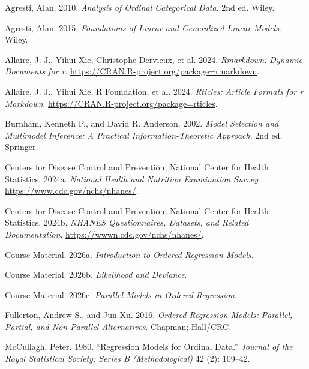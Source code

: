 \documentclass{article}
\newlength{\cslhangindent}
\newenvironment{CSLReferences}[2] %
 {\begin{list}{}{%
  \setlength{\itemindent}{0pt}
  \setlength{\leftmargin}{0pt}
  \setlength{\parsep}{0pt}
  \ifodd #1
   \setlength{\leftmargin}{\cslhangindent}
   \setlength{\itemindent}{-1\cslhangindent}
  \fi
  \setlength{\itemsep}{#2\baselineskip}}}
 {\end{list}}
\begin{document}
\protect{}\label{refs}
\begin{CSLReferences}{1}{1}
Agresti, Alan. 2010. \emph{Analysis of Ordinal Categorical Data}. 2nd
ed. Wiley.

Agresti, Alan. 2015. \emph{Foundations of Linear and Generalized Linear
Models}. Wiley.

Allaire, J. J., Yihui Xie, Christophe Dervieux, et al. 2024.
\emph{Rmarkdown: Dynamic Documents for r}.
\url{https://CRAN.R-project.org/package=rmarkdown}.

{Allaire, J. J., Yihui Xie, R Foundation, et al.} 2024. \emph{Rticles:
Article Formats for r Markdown}.
\url{https://CRAN.R-project.org/package=rticles}.

Burnham, Kenneth P., and David R. Anderson. 2002. \emph{Model Selection
and Multimodel Inference: A Practical Information-Theoretic Approach}.
2nd ed. Springer.

Centers for Disease Control and Prevention, National Center for Health
Statistics. 2024a. \emph{National Health and Nutrition Examination
Survey}. \url{https://www.cdc.gov/nchs/nhanes/}.

Centers for Disease Control and Prevention, National Center for Health
Statistics. 2024b. \emph{NHANES Questionnaires, Datasets, and Related
Documentation}. \url{https://wwwn.cdc.gov/nchs/nhanes/}.

Course Material. 2026a. \emph{Introduction to Ordered Regression
Models}.

Course Material. 2026b. \emph{Likelihood and Deviance}.

Course Material. 2026c. \emph{Parallel Models in Ordered Regression}.

Fullerton, Andrew S., and Jun Xu. 2016. \emph{Ordered Regression Models:
Parallel, Partial, and Non-Parallel Alternatives}. Chapman; Hall/CRC.

McCullagh, Peter. 1980. {``Regression Models for Ordinal Data.''}
\emph{Journal of the Royal Statistical Society: Series B
(Methodological)} 42 (2): 109--42.


\end{CSLReferences}
\end{document}
